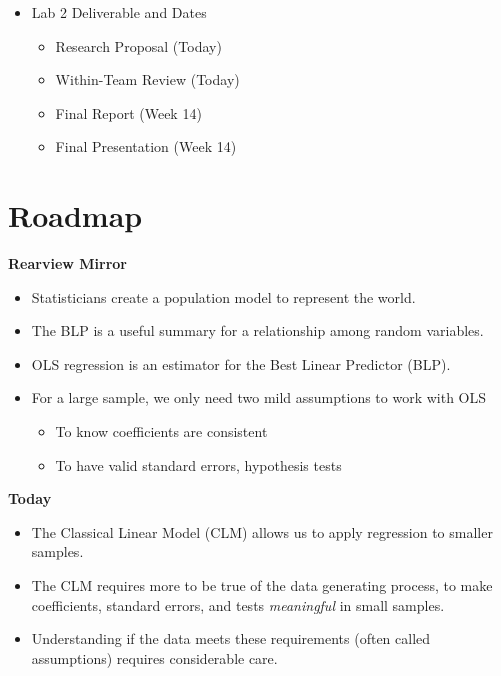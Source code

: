 \documentclass[
]{book}
\providecommand{\tightlist}{%
  \setlength{\itemsep}{0pt}\setlength{\parskip}{0pt}}
\theoremstyle{definition}
\theoremstyle{definition}
\theoremstyle{definition}
\theoremstyle{definition}
\theoremstyle{remark}
\begin{document}
\begin{itemize}
\tightlist
\item
  Lab 2 Deliverable and Dates

  \begin{itemize}
  \tightlist
  \item
    Research Proposal (Today)
  \item
    Within-Team Review (Today)
  \item
    Final Report (Week 14)
  \item
    Final Presentation (Week 14)
  \end{itemize}
\end{itemize}

\hypertarget{roadmap-8}{%
\section{Roadmap}\label{roadmap-8}}

\textbf{Rearview Mirror}

\begin{itemize}
\tightlist
\item
  Statisticians create a population model to represent the world.
\item
  The BLP is a useful summary for a relationship among random variables.
\item
  OLS regression is an estimator for the Best Linear Predictor (BLP).
\item
  For a large sample, we only need two mild assumptions to work with OLS

  \begin{itemize}
  \tightlist
  \item
    To know coefficients are consistent
  \item
    To have valid standard errors, hypothesis tests
  \end{itemize}
\end{itemize}

\textbf{Today}

\begin{itemize}
\tightlist
\item
  The Classical Linear Model (CLM) allows us to apply regression to smaller samples.
\item
  The CLM requires more to be true of the data generating process, to make coefficients, standard errors, and tests \emph{meaningful} in small samples.
\item
  Understanding if the data meets these requirements (often called assumptions) requires considerable care.
\end{itemize}
\end{document}
